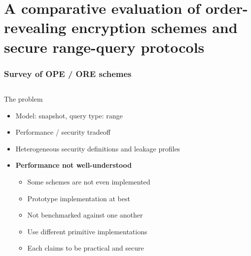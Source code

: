 \section{A comparative evaluation of order-revealing encryption schemes and secure range-query protocols~\cite{ore-benchmark-17}}

	\begin{frame}[label={frame:ore}]

		\frametitle{Survey of OPE / ORE schemes~\cite{ore-benchmark-17}}

		\begin{columns}[T,onlytextwidth]

				\begin{block}{The problem}

					\begin{itemize}[leftmargin=*]
						\item Model: \alert{snapshot}, query type: \alert{range}
						\item Performance / security tradeoff
						\item Heterogeneous security definitions and leakage profiles
						\item \textbf{Performance not well-understood}
						\begin{itemize}[leftmargin=*]
							\item Some schemes are not even implemented
							\item Prototype implementation at best
							\item Not benchmarked against one another
							\item Use different primitive implementations
							\item Each claims to be practical and secure
						\end{itemize}
					\end{itemize}

				\end{block}


\end{columns}
\end{frame}
